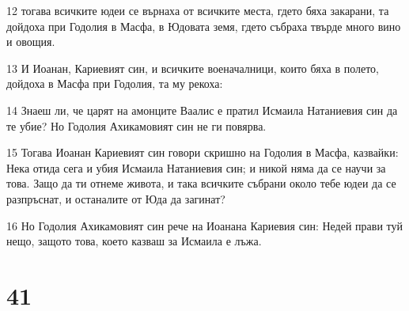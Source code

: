 \par 12 тогава всичките юдеи се върнаха от всичките места, гдето бяха закарани, та дойдоха при Годолия в Масфа, в Юдовата земя, гдето събраха твърде много вино и овощия.
\par 13 И Иоанан, Кариевият син, и всичките военачалници, които бяха в полето, дойдоха в Масфа при Годолия, та му рекоха:
\par 14 Знаеш ли, че царят на амонците Ваалис е пратил Исмаила Натаниевия син да те убие? Но Годолия Ахикамовият син не ги повярва.
\par 15 Тогава Иоанан Кариевият син говори скришно на Годолия в Масфа, казвайки: Нека отида сега и убия Исмаила Натаниевия син; и никой няма да се научи за това. Защо да ти отнеме живота, и така всичките събрани около тебе юдеи да се разпръснат, и останалите от Юда да загинат?
\par 16 Но Годолия Ахикамовият син рече на Иоанана Кариевия син: Недей прави туй нещо, защото това, което казваш за Исмаила е лъжа.

\chapter{41}

